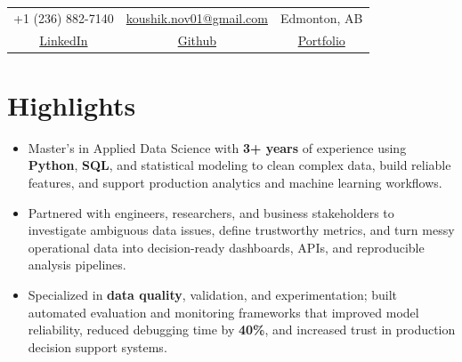 \documentclass[11pt,a4paper,sans]{moderncv}
\begin{document}
\makecvtitle
\vspace*{-10mm}

\begin{center}
	\begin{tabular}{ c c c }
		\faMobile\enspace +1 (236) 882-7140 & \enspace\faEnvelope\enspace \href{mailto:koushik.nov01@gmail.com}{koushik.nov01@gmail.com} & \enspace\faHome\enspace Edmonton, AB \\[2mm]
		\faLinkedin\enspace \href{https://www.linkedin.com/in/koushik-sivarama-krishnan/}{\textcolor{customblue}{LinkedIn}} & \faGithub\enspace \href{https://github.com/Koushik0901}{\textcolor{customblue}{Github}} & \faGlobe\enspace \href{https://koushik0901.github.io/}{\textcolor{customblue}{Portfolio}}
	\end{tabular}
\end{center}


\section{Highlights}
\setlength{\itemsep}{0pt}
\setlength{\parskip}{0pt}
\begin{itemize}[leftmargin=0.6cm, label={\textbullet}]
    \item Master’s in Applied Data Science with \textbf{3+ years} of experience using \textbf{Python}, \textbf{SQL}, and statistical modeling to clean complex data, build reliable features, and support production analytics and machine learning workflows.
    \vspace{-4pt}
    \item Partnered with engineers, researchers, and business stakeholders to investigate ambiguous data issues, define trustworthy metrics, and turn messy operational data into decision-ready dashboards, APIs, and reproducible analysis pipelines.
    \vspace{-4pt}
    \item Specialized in \textbf{data quality}, validation, and experimentation; built automated evaluation and monitoring frameworks that improved model reliability, reduced debugging time by \textbf{40\%}, and increased trust in production decision support systems.
    \vspace{-4pt}
\end{itemize}

\vspace{-16pt}
\end{document}
